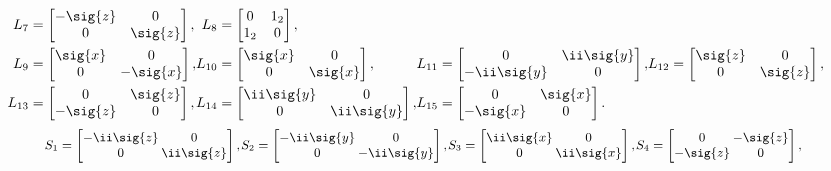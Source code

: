 \begin{unit}
\[\begin{aligned}
\mkern-18mu L_7&=\begin{bmatrix}-\sig{z}&0\\0&\sig{z}\end{bmatrix},&
\mkern-18mu L_8&=\begin{bmatrix}0&1_2\\1_2&0\end{bmatrix},\\
\mkern-18mu L_9&=\begin{bmatrix}\sig{x}&0\\0&-\sig{x}\end{bmatrix},&
\mkern-18mu L_{10}&=\begin{bmatrix}\sig{x}&0\\0&\sig{x}\end{bmatrix},&
\mkern-18mu L_{11}&=\begin{bmatrix}0&\ii\sig{y}\\-\ii\sig{y}&0\end{bmatrix},&
\mkern-18mu L_{12}&=\begin{bmatrix}\sig{z}&0\\0&\sig{z}\end{bmatrix},\\
\mkern-18mu
L_{13}&=\begin{bmatrix}0&\sig{z}\\-\sig{z}&0\end{bmatrix},&
\mkern-18mu
L_{14}&=\begin{bmatrix}\ii\sig{y}&0\\0&\ii\sig{y}\end{bmatrix},&
\mkern-18mu
L_{15}&=\begin{bmatrix}0&\sig{x}\\-\sig{x}&0\end{bmatrix}.
\end{aligned}
\]
%
\[\small
\setlength{\arraycolsep}{1pt}
\!\begin{aligned}
\mkern-18mu S_1&=\begin{bmatrix}-\ii\sig{z}&0\\0&\ii\sig{z}\end{bmatrix},&
\mkern-18mu S_2&=\begin{bmatrix}-\ii\sig{y}&0\\0&-\ii\sig{y}\end{bmatrix},&
\mkern-18mu S_3&=\begin{bmatrix}\ii\sig{x}&0\\0&\ii\sig{x}\end{bmatrix},&
\mkern-18mu S_4&=\begin{bmatrix}0&-\sig{z}\\-\sig{z}&0\end{bmatrix},\\

\end{aligned}\]
\end{unit}
